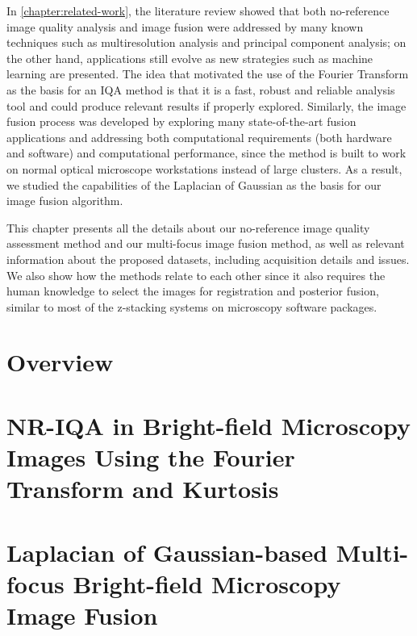 In \autoref{chapter:related-work}, the literature review showed that both no-reference image quality analysis and image fusion were addressed by many known techniques such as multiresolution analysis and principal component analysis; on the other hand, applications still evolve as new strategies such as machine learning are presented. The idea that motivated the use of the Fourier Transform as the basis for an IQA method is that it is a fast, robust and reliable analysis tool and could produce relevant results if properly explored. Similarly, the image fusion process was developed by exploring many state-of-the-art fusion applications and addressing both computational requirements (both hardware and software) and computational performance, since the method is built to work on normal optical microscope workstations instead of large clusters. As a result, we studied the capabilities of the Laplacian of Gaussian as the basis for our image fusion algorithm. 

This chapter presents all the details about our no-reference image quality assessment method and our multi-focus image fusion method, as well as relevant information about the proposed datasets, including acquisition details and issues. We also show how the methods relate to each other since it also requires the human knowledge to select the images for registration and posterior fusion, similar to most of the z-stacking systems on microscopy software packages.

\section{Overview}




\section{NR-IQA in Bright-field Microscopy Images Using the Fourier Transform and Kurtosis}


\section{Laplacian of Gaussian-based Multi-focus Bright-field Microscopy Image Fusion}

